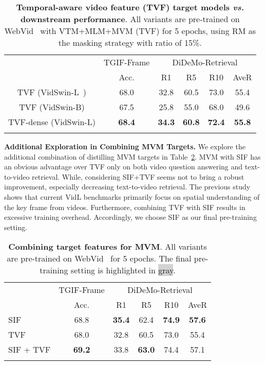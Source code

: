 \documentclass[10pt,twocolumn,letterpaper]{article}
\newlength\savewidth
\newcommand\shline{\noalign{\global\savewidth\arrayrulewidth\global\arrayrulewidth 1pt}\hline\noalign{\global\arrayrulewidth\savewidth}}
\newcommand{\tablestyle}[2]{\setlength{\tabcolsep}{#1}\renewcommand{\arraystretch}{#2}\centering\footnotesize}
\newcommand{\siftgif}{68.8\xspace}
\newcommand{\sifdro}{35.4\xspace}
\newcommand{\sifdrf}{62.4\xspace}
\newcommand{\sifdrt}{74.9\xspace}
\newcommand{\sifaver}{57.6\xspace}
\begin{document}
\begin{table}[H]
\centering
    \tablestyle{4.5pt}{1.2} 
    \def \w{20pt} 
\begin{tabular}{c| ccccc}
        \shline
        \multirow{2}{*}{MVM Target} & TGIF-Frame & \multicolumn{4}{c}{DiDeMo-Retrieval} \\
        \cmidrule(lr){2-2}\cmidrule(lr){3-6}
        & Acc. & R1 & R5 & R10 & AveR \\
        \hline
         TVF (VidSwin-L~\cite{liu2022video-swin}) & 68.0 & 32.8 & 60.5 & 73.0 & 55.4\\
         TVF (VidSwin-B) & 67.5 & 25.8 & 55.0 & 68.0 & 49.6\\
         \hline
         TVF-dense (VidSwin-L) & \textbf{68.4} & \textbf{34.3} & \textbf{60.8} & \textbf{72.4} & \textbf{55.8}\\
\shline
    \end{tabular}
\caption{\textbf{Temporal-aware video feature (TVF) target models \textit{vs.} downstream performance}. All variants are pre-trained on WebVid~\cite{bain2021frozen} with VTM+MLM+MVM (TVF) for 5 epochs, using RM as the masking strategy with ratio of 15\%. }
    \label{table:tvf}
\end{table}
 
\vspace{0.5ex}
\noindent \textbf{Additional Exploration in Combining MVM Targets.}
We explore the additional combination of distilling MVM targets in Table~\ref{table:mvm-webvid-combine-sif-tvf}. MVM with SIF has an obvious advantage over TVF only on both video question answering and text-to-video retrieval. While, considering SIF+TVF seems not to bring a robust improvement, especially decreasing text-to-video retrieval. The previous study~\cite{buch2022revisiting} shows that current VidL benchmarks primarily focus on spatial understanding of the key frame from videos. Furthermore, combining TVF with SIF results in excessive training overhead. Accordingly, we choose SIF as our final pre-training setting.
\vspace{-4ex}
\begin{table}[H]
\centering
    \tablestyle{7pt}{1.2} 
    \def \w{20pt} 
\begin{tabular}{l| ccccc}
        \shline
        \multirow{2}{*}{MVM Targets} & TGIF-Frame & \multicolumn{4}{c}{DiDeMo-Retrieval} \\
        \cmidrule(lr){2-2}\cmidrule(lr){3-6}
         & Acc. & R1 & R5 & R10 & AveR \\
        \hline
         \rowcolor{lightgray}
          SIF & \siftgif & \textbf{\sifdro} & \sifdrf & \textbf{\sifdrt} & \textbf{\sifaver}\\
         TVF & 68.0 & 32.8 & 60.5 & 73.0 & 55.4\\
        \hline
        SIF + TVF & \textbf{69.2} & 33.8 & \textbf{63.0} & 74.4 & 57.1\\
        \shline
    \end{tabular}
\caption{\textbf{Combining target features for MVM}. All
variants are pre-trained on WebVid~\cite{bain2021frozen} for 5 epochs. The final pre-training setting is highlighted in \colorbox{lightgray}{gray}.}
    \label{table:mvm-webvid-combine-sif-tvf}
\end{table}
 
\end{document}
